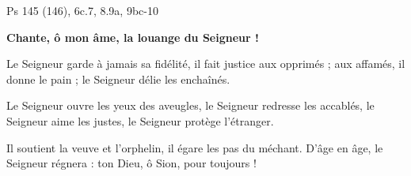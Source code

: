  Ps 145 (146), 6c.7, 8.9a, 9bc-10

\textbf{Chante, ô mon âme,
la louange du Seigneur !}

\smallskip

Le Seigneur garde à jamais sa fidélité,
il fait justice aux opprimés ;
aux affamés, il donne le pain ;
le Seigneur délie les enchaînés.

\smallskip

Le Seigneur ouvre les yeux des aveugles,
le Seigneur redresse les accablés,
le Seigneur aime les justes,
le Seigneur protège l’étranger.

\smallskip

Il soutient la veuve et l’orphelin,
il égare les pas du méchant.
D’âge en âge, le Seigneur régnera :
ton Dieu, ô Sion, pour toujours !
